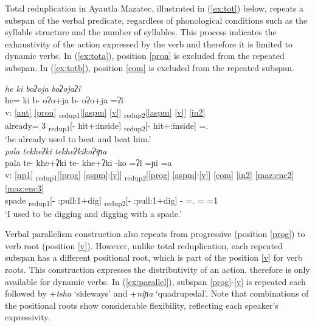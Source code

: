 \documentclass[output=paper]{langscibook}
\begin{document}
Total reduplication in Ayautla Mazatec, illustrated in (\ref{ex:tot}) below, repeats a subspan of the verbal predicate, regardless of phonological conditions such as the syllable structure and the number of syllables. This process indicates the exhaustivity of the action expressed by the verb and therefore it is limited to dynamic verbs.
In (\ref{ex:tota}), position \ref{pron} is excluded from the repeated subspan. In (\ref{ex:totb}), position \ref{com} is excluded from the repeated subspan.

\ea \label{ex:tot}
\ea \label{ex:tota} \textit{he\2 \st{}k\lab{}i\2 bo\2ʔo\2\st{}ja\4 bo\2ʔo\2\st{}ja\4ʔĩ\3}\\  %
\glll {} he\2\ff= k\lab{}i\2 b- o\2ʔo\2+ja\4 b- o\2ʔo\2+ja\4 =ʔĩ\3\ff\\
v: \ref{ant} \ref{pron} \textsubscript{redup1}[\ref{aspm} \ref{v}] \textsubscript{redup2}[\ref{aspm} \ref{v}] \ref{in2}\\
{} already= \Pronom{}3 \textsubscript{redup1}[\Hab- hit+\Pos:inside] \textsubscript{redup2}[\Hab- hit+\Pos:inside] =\Pst.\Hab\\
\glt `he already used to beat and beat him.'\\
\ex\label{ex:totb} \textit{pa\2\3\st{}la\1 te\2khe\2\st{}ʔ\ssn{}ki\3 te\2khe\2ʔ\ssn{}ki\2\st{}ko\4ʔĩ\3ɲa\3\2}\\  %
\glll {} pa\2\3la\1 te\2- khe\2+ʔ\ssn{}ki\3 te\2- khe\2+ʔ\ssn{}ki\3\ff{} -ko\1\3 =ʔĩ\3\ff{} =ɲi\3\ff{} =a\2\\
v: \ref{np1} \textsubscript{redup1}[\ref{prog} \ref{aspm}:\ref{v}] \textsubscript{redup2}[\ref{prog} \ref{aspm}:\ref{v}] \ref{com} \ref{in2} \ref{maz:enc2} \ref{maz:enc3}\\
{} spade \textsubscript{redup1}[\Prog- \Hab:pull:1+dig] \textsubscript{redup2}[\Prog- \Hab:pull:1+dig] -\Com{} =\Pst.\Hab{} =\Asr{} =1\Sg{}\\
\glt `I used to be digging and digging with a spade.'
\z
\z

Verbal parallelism construction also repeats from progressive (position \ref{prog}) to verb root (position \ref{v}). However, unlike total reduplication, each repeated subspan has a different positional root, which is part of the position \ref{v} for verb roots. This construction expresses the distributivity of an action, therefore is only available for dynamic verbs.
In (\ref{ex:parallel}), subspan \ref{prog}-\ref{v} is repeated each followed by +\textit{tsha\3\ff} `sideways' and +\textit{ni\2ɲa\2} `quadrupedal'. Note that combinations of the positional roots show considerable flexibility, reflecting each speaker's expressivity.
\end{document}
